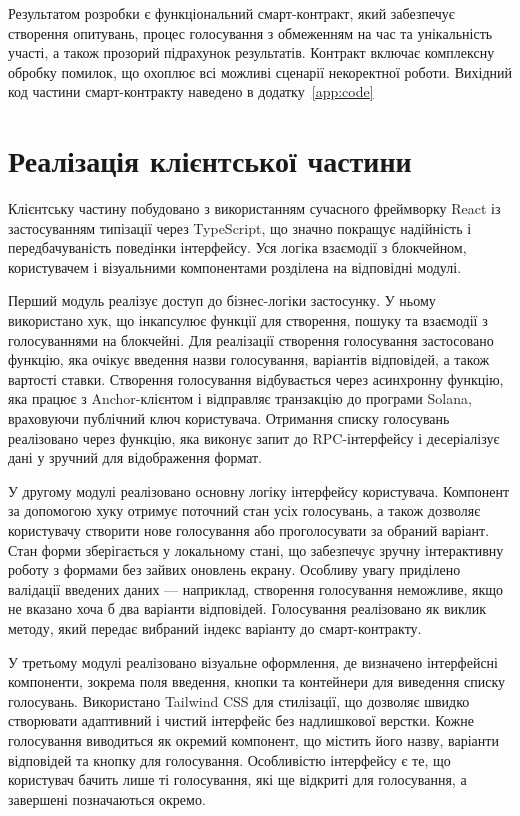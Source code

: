 \documentclass[14pt]{extreport}
\begin{document}
  Результатом розробки є функціональний смарт-контракт, який забезпечує створення опитувань, процес голосування з обмеженням на час та унікальність участі, а також прозорий підрахунок результатів. Контракт включає комплексну обробку помилок, що охоплює всі можливі сценарії некоректної роботи. Вихідний код частини смарт-контракту наведено в додатку~\ref{app:code}
  
  \section{Реалізація клієнтської частини}
  
  Клієнтську частину побудовано з використанням сучасного фреймворку React із застосуванням типізації через TypeScript, що значно покращує надійність і передбачуваність поведінки інтерфейсу. Уся логіка взаємодії з блокчейном, користувачем і візуальними компонентами розділена на відповідні модулі.

  Перший модуль реалізує доступ до бізнес-логіки застосунку. У ньому використано хук, що інкапсулює функції для створення, пошуку та взаємодії з голосуваннями на блокчейні. Для реалізації створення голосування застосовано функцію, яка очікує введення назви голосування, варіантів відповідей, а також вартості ставки. Створення голосування відбувається через асинхронну функцію, яка працює з Anchor-клієнтом і відправляє транзакцію до програми Solana, враховуючи публічний ключ користувача. Отримання списку голосувань реалізовано через функцію, яка виконує запит до RPC-інтерфейсу і десеріалізує дані у зручний для відображення формат.

  У другому модулі реалізовано основну логіку інтерфейсу користувача. Компонент за допомогою хуку отримує поточний стан усіх голосувань, а також дозволяє користувачу створити нове голосування або проголосувати за обраний варіант. Стан форми зберігається у локальному стані, що забезпечує зручну інтерактивну роботу з формами без зайвих оновлень екрану. Особливу увагу приділено валідації введених даних — наприклад, створення голосування неможливе, якщо не вказано хоча б два варіанти відповідей. Голосування реалізовано як виклик методу, який передає вибраний індекс варіанту до смарт-контракту.

  У третьому модулі реалізовано візуальне оформлення, де визначено інтерфейсні компоненти, зокрема поля введення, кнопки та контейнери для виведення списку голосувань. Використано Tailwind CSS для стилізації, що дозволяє швидко створювати адаптивний і чистий інтерфейс без надлишкової верстки. Кожне голосування виводиться як окремий компонент, що містить його назву, варіанти відповідей та кнопку для голосування. Особливістю інтерфейсу є те, що користувач бачить лише ті голосування, які ще відкриті для голосування, а завершені позначаються окремо.
\end{document}
